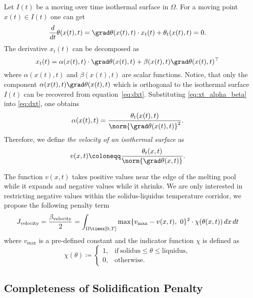 Let $I(t)$ be a moving over time isothermal surface in $\Omega$. For a moving point $x(t) \in I(t)$ one can get
\begin{equation} \label{eq:dxt}
	\frac{d}{dt} \theta(x(t),t) = \grad \theta(x(t),t) \cdot x_t(t) + \theta_t(x(t),t) = 0.
\end{equation}
The derivative $x_t(t)$ can be decomposed as
\begin{equation} \label{eq:xt_alpha_beta}
	x_t(t) = \alpha(x(t),t) \cdot \grad \theta(x(t),t) + \beta(x(t),t) \grad \theta(x(t),t)^{\top}
\end{equation}
where $\alpha(x(t),t)$ and $\beta(x(t),t)$ are scalar functions. Notice, that only the component $\alpha(x(t),t) \grad \theta(x(t),t)$ which is orthogonal to the isothermal surface $I(t)$ can be recovered from equation~\eqref{eq:dxt}. Substituting \eqref{eq:xt_alpha_beta} into \eqref{eq:dxt}, one obtains
\begin{equation}
	\alpha(x(t),t) = \frac{\theta_t(x(t),t)}{\norm{\grad \theta(x(t),t)}^2}.
\end{equation}
Therefore, we define \emph{the velocity of an isothermal surface} as
\begin{equation}
	v(x,t) \coloneqq \frac{\theta_t(x,t)}{\norm{\grad \theta(x,t)}}.
\end{equation}

The function $v(x,t)$ takes positive values near the edge of the melting pool while it expands and negative values while it shrinks. We are only interested in restricting negative values within the solidus-liquidus temperature corridor, we propose the following penalty term
\begin{equation}
	J_{\text{velocity}} = \frac{\beta_\text{velocity}}{2} =
	\int_{\Omega \timex [0,T]} \max \{ v_{\max} - v(x,t),\ 0 \}^2 \cdot \chi(\theta(x,t))\, dx\,dt
\end{equation}
where $v_{\max}$ is a pre-defined constant and the indicator function $\chi$ is defined as
\begin{equation}
	\chi(\theta) \coloneqq \left\{
		\begin{array}{ll}
			1, & \text{if}\ \text{solidus} \le \theta \le \text{liquidus}, \\
			0, & \text{otherwise}.
		\end{array} \right.
\end{equation}


\subsection{Completeness of Solidification Penalty}

